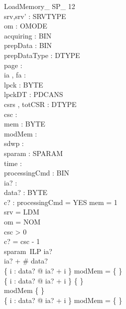\begin{schema}{LoadMemory\_ SP\_ 12}\\
 srv,srv' : SRVTYPE \\
 om : OMODE \\
 acquiring : BIN \\
 prepData : BIN \\
 prepDataType : DTYPE \\
 page : \nat \\
 ia , fa : \nat \\
 lpck : \seq BYTE \\
 lpckDT : PDCANS \\
 csrs , totCSR : DTYPE \fun \nat \\
 csc : \nat \\
 mem : \nat \pfun BYTE \\
 modMem : \power \nat \\
 sdwp : \nat \\
 sparam : SPARAM \fun \nat \\
 time : \nat \\
 processingCmd : BIN \\
 ia? : \nat \\
 data? : \seq BYTE \\
 c? : \nat 
\where
 processingCmd = YES \land \dom mem = 1  \\
 srv = LDM \\
 om = NOM \\
 csc > 0 \\
 c? = csc - 1 \\
 sparam~ILP \leq ia? \\
 ia? + \# data?   \\
 \{ i : \dom data? @ ia? + i \} \cap modMem = \{ \} \\
 \{ i : \dom data? @ ia? + i \} \neq \{ \} \\
 modMem \neq \{ \} \\
 \{ i : \dom data? @ ia? + i \} \cap modMem = \{ \}
\end{schema}

